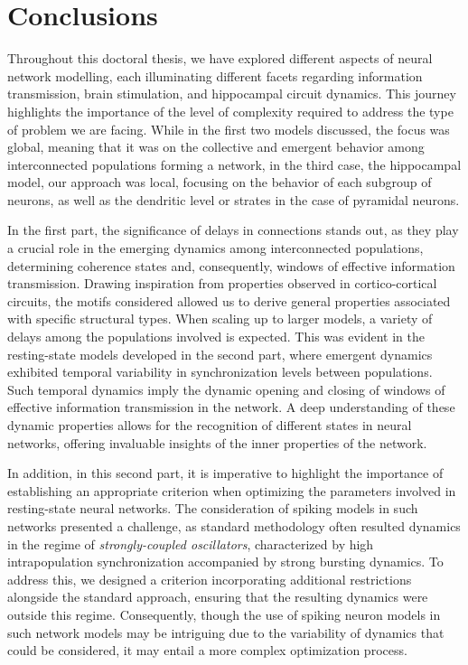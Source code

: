 \documentclass[../main.tex]{subfiles}
\begin{document}
\chapter{Conclusions}
Throughout this doctoral thesis, we have explored different aspects of neural network modelling, each illuminating different facets regarding information transmission, brain stimulation, and hippocampal circuit dynamics.
This journey highlights the importance of the level of complexity required to address the type of problem we are facing.
While in the first two models discussed, the focus was global, meaning that it was on the collective and emergent behavior among interconnected populations forming a network, in the third case, the hippocampal model, our approach was local, focusing on the behavior of each subgroup of neurons, as well as the dendritic level or strates in the case of pyramidal neurons.

In the first part, the significance of delays in connections stands out, as they play a crucial role in the emerging dynamics among interconnected populations, determining coherence states and, consequently, windows of effective information transmission.
Drawing inspiration from properties observed in cortico-cortical circuits, the motifs considered allowed us to derive general properties associated with specific structural types.
When scaling up to larger models, a variety of delays among the populations involved is expected.
This was evident in the resting-state models developed in the second part, where emergent dynamics exhibited temporal variability in synchronization levels between populations.
Such temporal dynamics imply the dynamic opening and closing of windows of effective information transmission in the network.
A deep understanding of these dynamic properties allows for the recognition of different states in neural networks, offering invaluable insights of the inner properties of the network.

In addition, in this second part, it is imperative to highlight the importance of establishing an appropriate criterion when optimizing the parameters involved in resting-state neural networks.
The consideration of spiking models in such networks presented a challenge, as standard methodology often resulted dynamics in the regime of \textit{strongly-coupled oscillators}, characterized by high intrapopulation synchronization accompanied by strong bursting dynamics.
To address this, we designed a criterion incorporating additional restrictions alongside the standard approach, ensuring that the resulting dynamics were outside this regime.
Consequently, though the use of spiking neuron models in such network models may be intriguing due to the variability of dynamics that could be considered, it may entail a more complex optimization process.
\end{document}
